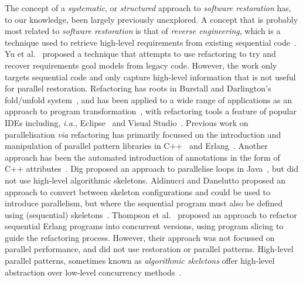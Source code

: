 The concept of a \emph{systematic}, or \emph{structured} approach to \emph{software restoration} has, to our knowledge, been largely previously unexplored. A concept that is probably most related to \emph{software restoration} is that of \emph{reverse engineering}, which is a technique used to retrieve high-level requirements from existing sequential code~\cite{10.1145/287000.287001,10.1145/337180.337234}. Yu et al.~\cite{10.1109/RE.2005.61} proposed a technique that attempts to use refactoring to try and recover requirements goal models from legacy code. However, the work only targets sequential code and only capture high-level information that is not useful for parallel restoration.
%
Refactoring has roots in Burstall and Darlington's fold/unfold system~\cite{darlington77}, and has been applied to a wide range of applications as an approach to program transformation~\cite{mens_refactoring}, with refactoring tools a feature of popular IDEs including, \textit{i.a.}, Eclipse~\cite{EclipseWeb} and Visual Studio~\cite{VisualStudioWeb}.
Previous work on parallelisation \textit{via} refactoring has primarily focussed on the introduction and manipulation of parallel pattern libraries in C++~\cite{brownagricultural,DBLP:conf/pdp/JanjicBMHDAG16} and Erlang~\cite{hlpp,DBLP:journals/cai/BarwellBHTB16}. Another approach
has been the automated introduction of annotations in the form of
C++ attributes~\cite{rio:2018}. Dig proposed an approach to parallelise loops in Java~\cite{dig}, but did not use high-level algorithmic skeletons. Aldinucci and Danelutto proposed an approach to convert between skeleton configurations and could be used to introduce parallelism, but where the sequential program must also be defined using (sequential) skeletons~\cite{pdcs:nf:99}. Thompson et al.~\cite{10.1145/2678015.2682533} proposed an approach to refactor sequential Erlang programs into concurrent versions, using program slicing to guide the refactoring process. However, their approach was not focussed on parallel performance, and did not use restoration or parallel patterns.  
%
%
High-level parallel patterns, sometimes known as \emph{algorithmic skeletons} offer high-level abstraction over low-level concurrency methods~\cite{Asanovic:2009:VPC,DBLP:journals/spe/Gonzalez-VelezL10}.
